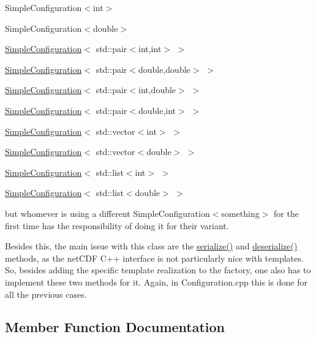 \begin{DoxyItemize}
\item Simple\+Configuration$<$int$>$
\item Simple\+Configuration$<$double$>$
\item \mbox{\hyperlink{class_s_m_spp__di__unipi__it_1_1_simple_configuration}{Simple\+Configuration}}$<$ std\+::pair$<$int,int$>$ $>$
\item \mbox{\hyperlink{class_s_m_spp__di__unipi__it_1_1_simple_configuration}{Simple\+Configuration}}$<$ std\+::pair$<$double,double$>$ $>$
\item \mbox{\hyperlink{class_s_m_spp__di__unipi__it_1_1_simple_configuration}{Simple\+Configuration}}$<$ std\+::pair$<$int,double$>$ $>$
\item \mbox{\hyperlink{class_s_m_spp__di__unipi__it_1_1_simple_configuration}{Simple\+Configuration}}$<$ std\+::pair$<$double,int$>$ $>$
\item \mbox{\hyperlink{class_s_m_spp__di__unipi__it_1_1_simple_configuration}{Simple\+Configuration}}$<$ std\+::vector$<$int$>$ $>$
\item \mbox{\hyperlink{class_s_m_spp__di__unipi__it_1_1_simple_configuration}{Simple\+Configuration}}$<$ std\+::vector$<$double$>$ $>$
\item \mbox{\hyperlink{class_s_m_spp__di__unipi__it_1_1_simple_configuration}{Simple\+Configuration}}$<$ std\+::list$<$int$>$ $>$
\item \mbox{\hyperlink{class_s_m_spp__di__unipi__it_1_1_simple_configuration}{Simple\+Configuration}}$<$ std\+::list$<$double$>$ $>$
\end{DoxyItemize}

but whomever is using a different Simple\+Configuration$<$something$>$ for the first time has the responsibility of doing it for their variant.

Besides this, the main issue with this class are the \mbox{\hyperlink{class_s_m_spp__di__unipi__it_1_1_simple_configuration_a8a626d908100f4419905d89f771150aa}{serialize()}} and \mbox{\hyperlink{class_s_m_spp__di__unipi__it_1_1_simple_configuration_a828ece608e8a4a497f43d3d6bb75af40}{deserialize()}} methods, as the net\+C\+DF C++ interface is not particularly nice with templates. So, besides adding the specific template realization to the factory, one also has to implement these two methods for it. Again, in Configuration.\+cpp this is done for all the previous cases. 

\subsection{Member Function Documentation}
\mbox{\label{class_s_m_spp__di__unipi__it_1_1_simple_configuration_a828ece608e8a4a497f43d3d6bb75af40}} 
